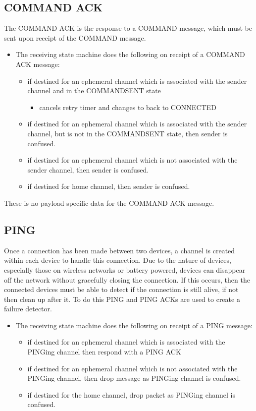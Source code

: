 \subsection{COMMAND ACK} %
\label{sub:command_ack}
The COMMAND ACK is the response to a COMMAND message, which must be sent upon receipt of the COMMAND message.
\vspace{-5mm} 
\begin{itemize}
	\item [] The receiving state machine does the following on receipt of a COMMAND ACK message:
	\begin{itemize}
		\item if destined for an ephemeral channel which is associated with the sender channel and in the COMMANDSENT state
		\begin{itemize}
			\item cancels retry timer and changes to back to CONNECTED
		\end{itemize}
		\item if destined for an ephemeral channel which is associated with the sender channel, but is not in the COMMANDSENT state, then sender is confused.
		\item if destined for an ephemeral channel which is not associated with the sender channel, then sender is confused.
		\item if destined for home channel, then sender is confused.
	\end{itemize}
\end{itemize}

These is no payload specific data for the COMMAND ACK message.

\subsection{PING} %
\label{sub:ping}
Once a connection has been made between two devices, a channel is created within each device to handle this connection. Due to the nature of devices, especially those on wireless networks or battery powered, devices can disappear off the network without gracefully closing the connection. If this occurs, then the connected devices must be able to detect if the connection is still alive, if not then clean up after it. To do this PING and PING ACKs are used to create a failure detector.
\vspace{-5mm} 
\begin{itemize}
	\item []The receiving state machine does the following on receipt of a PING message:
	\begin{itemize}
		\item if destined for an ephemeral channel which is associated with the PINGing channel then respond with a PING ACK
		\item if destined for an ephemeral channel which is not associated with the PINGing channel, then drop message as PINGing channel is confused.
		\item if destined for the home channel, drop packet as PINGing channel is confused.
	\end{itemize}
\end{itemize}

